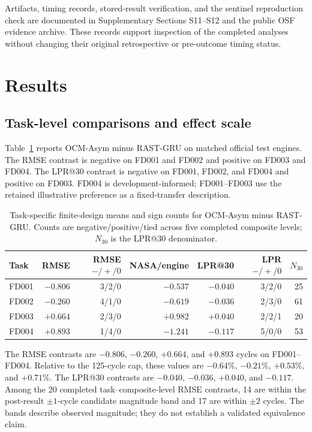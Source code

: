 \documentclass[preprint,12pt,numbers,sort&compress]{elsarticle}
\begin{document}
Artifacts, timing records, stored-result verification, and the sentinel reproduction check are documented in Supplementary Sections S11--S12 and the public OSF evidence archive. These records support inspection of the completed analyses without changing their original retrospective or pre-outcome timing status.

\section{Results}

\subsection{Task-level comparisons and effect scale}

Table~\ref{tab:fixed-effects} reports OCM-Asym minus RAST-GRU on matched official test engines. The RMSE contrast is negative on FD001 and FD002 and positive on FD003 and FD004. The LPR@30 contrast is negative on FD001, FD002, and FD004 and positive on FD003. FD004 is development-informed; FD001--FD003 use the retained illustrative preference as a fixed-transfer description.



\begin{table}[!t]
\centering
\small
\caption{Task-specific finite-design means and sign counts for OCM-Asym minus RAST-GRU. Counts are negative/positive/tied across five completed composite levels; $N_{30}$ is the LPR@30 denominator.}
\label{tab:fixed-effects}
\setlength{\tabcolsep}{4pt}
\begin{tabular}{@{}lrrrrrr@{}}
\toprule
Task & RMSE & RMSE $-/+/0$ & NASA/engine & LPR@30 & LPR $-/+/0$ & $N_{30}$ \\
\midrule
FD001 & $-0.806$ & 3/2/0 & $-0.537$ & $-0.040$ & 3/2/0 & 25 \\
FD002 & $-0.260$ & 4/1/0 & $-0.619$ & $-0.036$ & 2/3/0 & 61 \\
FD003 & $+0.664$ & 2/3/0 & $+0.982$ & $+0.040$ & 2/2/1 & 20 \\
FD004 & $+0.893$ & 1/4/0 & $-1.241$ & $-0.117$ & 5/0/0 & 53 \\
\bottomrule
\end{tabular}
\end{table}
\setlength{\tabcolsep}{6pt}
\FloatBarrier

The RMSE contrasts are $-0.806$, $-0.260$, $+0.664$, and $+0.893$ cycles on FD001--FD004. Relative to the 125-cycle cap, these values are $-0.64\%$, $-0.21\%$, $+0.53\%$, and $+0.71\%$. The LPR@30 contrasts are $-0.040$, $-0.036$, $+0.040$, and $-0.117$. Among the 20 completed task--composite-level RMSE contrasts, 14 are within the post-result $\pm1$-cycle candidate magnitude band and 17 are within $\pm2$ cycles. The bands describe observed magnitude; they do not establish a validated equivalence claim.
\end{document}
